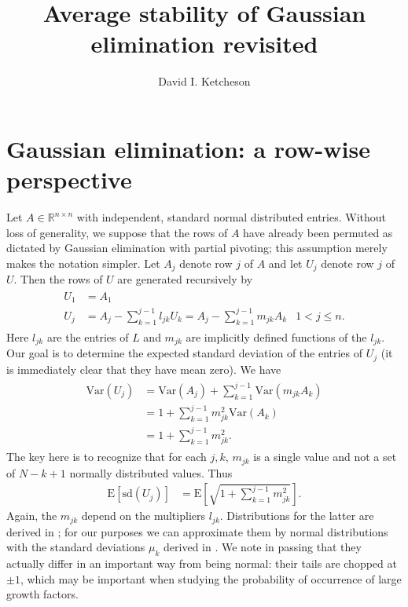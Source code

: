 \documentclass[12pt]{article}
\title{Average stability of Gaussian elimination revisited}
\author{David I. Ketcheson}
\newcommand{\Var}{\mathrm{Var}}
\newcommand{\E}{\mathrm{E}}
\newcommand{\sd}{\mathrm{sd}}
\newcommand{\Real}{\mathbb R}
\begin{document}
\maketitle


\section{Gaussian elimination: a row-wise perspective}
Let $A\in\Real^{n\times n}$ with independent, standard normal distributed
entries.  Without loss of generality, we suppose that the rows of $A$ have
already been permuted as dictated by Gaussian elimination with partial
pivoting; this assumption merely makes the notation simpler.  Let $A_j$
denote row $j$ of $A$ and let $U_j$ denote row $j$ of $U$.  Then the rows
of $U$ are generated recursively by
\begin{align} \label{A_rows}
\begin{aligned}
U_1 & = A_1 \\
U_j & = A_j - \sum_{k=1}^{j-1} l_{jk} U_k  = A_j - \sum_{k=1}^{j-1} m_{jk} A_k & 1 < j \le n.
\end{aligned}
\end{align}
Here $l_{jk}$ are the entries of $L$ and $m_{jk}$ are implicitly defined functions
of the $l_{jk}$.  Our goal is to determine the
expected standard deviation of the entries of $U_j$ (it is immediately clear that they
have mean zero).  We have
\begin{align}
\begin{aligned}
\Var(U_j) & = \Var(A_j) + \sum_{k=1}^{j-1} \Var(m_{jk} A_k) \\
          & = 1+ \sum_{k=1}^{j-1} m_{jk}^2 \Var(A_k) \\
          & = 1 + \sum_{k=1}^{j-1} m_{jk}^2.
\end{aligned}
\end{align}
The key here is to recognize that for each $j,k$, $m_{jk}$ is
a single value and not a set of $N-k+1$ normally distributed values.
Thus
\begin{align} \label{expected_sd}
\E[\sd(U_j)] & = \E\left[\sqrt{1+\sum_{k=1}^{j-1} m_{jk}^2}\right].
\end{align}
Again, the $m_{jk}$ depend on the multipliers $l_{jk}$.  Distributions
for the latter are derived in \cite[Section 4]{trefethen1990}; for our
purposes we can approximate them by normal distributions with the
standard deviations $\mu_k$ derived in \cite{trefethen1990}.
We note in passing that they actually differ in an important way from being 
normal: their tails are chopped at $\pm 1$, which may be important
when studying the probability of occurrence of large growth factors.
\end{document}
